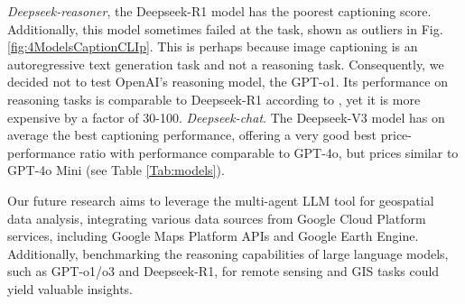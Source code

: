\textit{Deepseek-reasoner}, the Deepseek-R1 model has the poorest captioning score. Additionally, this model sometimes failed at the task, shown as outliers in Fig. \ref{fig:4ModelsCaptionCLIp}. This is perhaps because image captioning is an autoregressive text generation task and not a reasoning task. Consequently, we decided not to test OpenAI's reasoning model, the GPT-o1. Its performance on reasoning tasks is comparable to Deepseek-R1 according to \cite{deepseekr1}, yet it is more expensive by a factor of 30-100. \textit{Deepseek-chat}. The Deepseek-V3 model has on average the best captioning performance, offering a very good best price-performance ratio with performance comparable to GPT-4o, but prices similar to GPT-4o Mini (see Table \ref{Tab:models}).



Our future research aims to leverage the multi-agent LLM tool for geospatial data analysis, integrating various data sources from Google Cloud Platform services, including Google Maps Platform APIs and Google Earth Engine. Additionally, benchmarking the reasoning capabilities of large language models, such as GPT-o1/o3 and Deepseek-R1, for remote sensing and GIS tasks could yield valuable insights.







